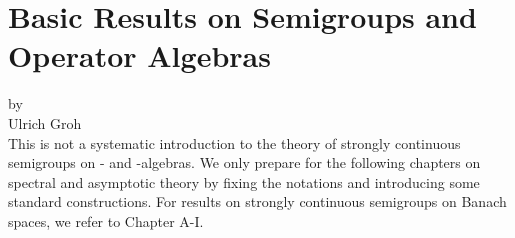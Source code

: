 \chapter{Basic Results on Semigroups and Operator Algebras}\label{chap:d1}
{\Large
\vspace*{-.75cm}
by \\[.25em]
Ulrich Groh
\vspace{.75cm}
\\
}
This is not a systematic introduction to the theory of strongly continuous semigroups on \CA- and \WA-algebras.
We only prepare for the following chapters on spectral and asymptotic theory by fixing the notations and introducing some standard constructions.
For results on strongly continuous semigroups on Banach spaces, we refer to Chapter A-I.%
